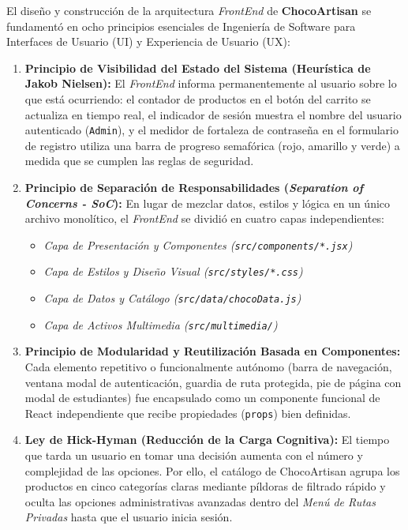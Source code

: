 \documentclass[12pt,letterpaper]{article}
\begin{document}
El diseño y construcción de la arquitectura \textit{FrontEnd} de \textbf{ChocoArtisan} se fundamentó en ocho principios esenciales de Ingeniería de Software para Interfaces de Usuario (UI) y Experiencia de Usuario (UX):

\begin{enumerate}[leftmargin=1.2cm]
  \item \textbf{Principio de Visibilidad del Estado del Sistema (Heurística de Jakob Nielsen):}
    El \textit{FrontEnd} informa permanentemente al usuario sobre lo que está ocurriendo: el contador de productos en el botón del carrito se actualiza en tiempo real, el indicador de sesión muestra el nombre del usuario autenticado (\texttt{Admin}), y el medidor de fortaleza de contraseña en el formulario de registro utiliza una barra de progreso semafórica (rojo, amarillo y verde) a medida que se cumplen las reglas de seguridad.

  \item \textbf{Principio de Separación de Responsabilidades (\textit{Separation of Concerns - SoC}):}
    En lugar de mezclar datos, estilos y lógica en un único archivo monolítico, el \textit{FrontEnd} se dividió en cuatro capas independientes:
    \begin{itemize}
      \item \textit{Capa de Presentación y Componentes (\texttt{src/components/*.jsx})}
      \item \textit{Capa de Estilos y Diseño Visual (\texttt{src/styles/*.css})}
      \item \textit{Capa de Datos y Catálogo (\texttt{src/data/chocoData.js})}
      \item \textit{Capa de Activos Multimedia (\texttt{src/multimedia/})}
    \end{itemize}

  \item \textbf{Principio de Modularidad y Reutilización Basada en Componentes:}
    Cada elemento repetitivo o funcionalmente autónomo (barra de navegación, ventana modal de autenticación, guardia de ruta protegida, pie de página con modal de estudiantes) fue encapsulado como un componente funcional de React independiente que recibe propiedades (\texttt{props}) bien definidas.

  \item \textbf{Ley de Hick-Hyman (Reducción de la Carga Cognitiva):}
    El tiempo que tarda un usuario en tomar una decisión aumenta con el número y complejidad de las opciones. Por ello, el catálogo de ChocoArtisan agrupa los productos en cinco categorías claras mediante píldoras de filtrado rápido y oculta las opciones administrativas avanzadas dentro del \textit{Menú de Rutas Privadas} hasta que el usuario inicia sesión.


\end{enumerate}
\end{document}
